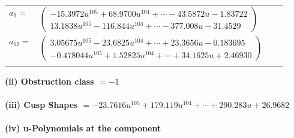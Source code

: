 \documentclass[1p]{elsarticle_modified}
\theoremstyle{definition}
\begin{document}
\begin{tabular}{m{7pt} m{180pt} m{7pt} m{180pt} }
\flushright $a_{9}=$&$\begin{pmatrix}-15.3972 u^{105}+68.9700 u^{104}+\cdots-43.5872 u-1.83722\\13.1838 u^{105}-116.844 u^{104}+\cdots-377.008 u-31.4529\end{pmatrix}$ \\
\flushright $a_{12}=$&$\begin{pmatrix}3.05675 u^{105}-23.6825 u^{104}+\cdots+23.3656 u-0.183695\\-0.478044 u^{105}+1.52825 u^{104}+\cdots+34.1625 u+2.46930\end{pmatrix}$\\&\end{tabular}
\flushleft \textbf{(ii) Obstruction class $= -1$}\\~\\
\flushleft \textbf{(iii) Cusp Shapes $= -23.7616 u^{105}+179.119 u^{104}+\cdots+290.283 u+26.9682$}\\~\\
\newpage\renewcommand{\arraystretch}{1}
\flushleft \textbf{(iv) u-Polynomials at the component}\newline \\
\end{document}
